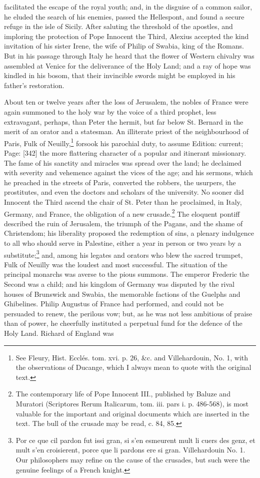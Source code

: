 facilitated the escape of the royal youth; and, in the disguise of a common sailor, he eluded the search of his enemies, passed the Hellespont, and found a secure refuge in the isle of Sicily. After saluting the threshold of the apostles, and imploring the protection of Pope Innocent the Third, Alexius accepted the kind invitation of his sister Irene, the wife of Philip of Swabia, king of the Romans. But in his passage through Italy he heard that the flower of Western chivalry was assembled at Venice for the deliverance of the Holy Land; and a ray of hope was kindled in his bosom, that their invincible swords might be employed in his father\texthebrew{}’s restoration.

About ten or twelve years after the loss of Jerusalem, the nobles of France were again summoned to the holy war by the voice of a third prophet, less extravagant, perhaps, than Peter the hermit, but far below St. Bernard in the merit of an orator and a statesman. An illiterate priest of the neighbourhood of Paris, Fulk of Neuilly,\footnote{See Fleury, Hist. Ecclés. tom. xvi. p. 26, \&c. and Villehardouin, No. 1, with the observations of Ducange, which I always mean to quote with the original text.} forsook his parochial duty, to assume Edition: current; Page: [342] the more flattering character of a popular and itinerant missionary. The fame of his sanctity and miracles was spread over the land; he declaimed with severity and vehemence against the vices of the age; and his sermons, which he preached in the streets of Paris, converted the robbers, the usurpers, the prostitutes, and even the doctors and scholars of the university. No sooner did Innocent the Third ascend the chair of St. Peter than he proclaimed, in Italy, Germany, and France, the obligation of a new crusade.\footnote{The contemporary life of Pope Innocent III., published by Baluze and Muratori (Scriptores Rerum Italicarum, tom. iii. pars i. p. 486-568), is most valuable for the important and original documents which are inserted in the text. The bull of the crusade may be read, c. 84, 85.} The eloquent pontiff described the ruin of Jerusalem, the triumph of the Pagans, and the shame of Christendom; his liberality proposed the redemption of sins, a plenary indulgence to all who should serve in Palestine, either a year in person or two years by a substitute;\footnote{Por ce que cil pardon fut issi gran, si s\texthebrew{}’en esmeurent mult li cuers des genz, et mult s\texthebrew{}’en croisierent, porce que li pardons ere si gran. Villehardouin No. 1. Our philosophers may refine on the cause of the crusades, but such were the genuine feelings of a French knight.} and, among his legates and orators who blew the sacred trumpet, Fulk of Neuilly was the loudest and most successful. The situation of the principal monarchs was averse to the pious summons. The emperor Frederic the Second was a child; and his kingdom of Germany was disputed by the rival houses of Brunswick and Swabia, the memorable factions of the Guelphs and Ghibelines. Philip Augustus of France had performed, and could not be persuaded to renew, the perilous vow; but, as he was not less ambitious of praise than of power, he cheerfully instituted a perpetual fund for the defence of the Holy Land. Richard of England was 